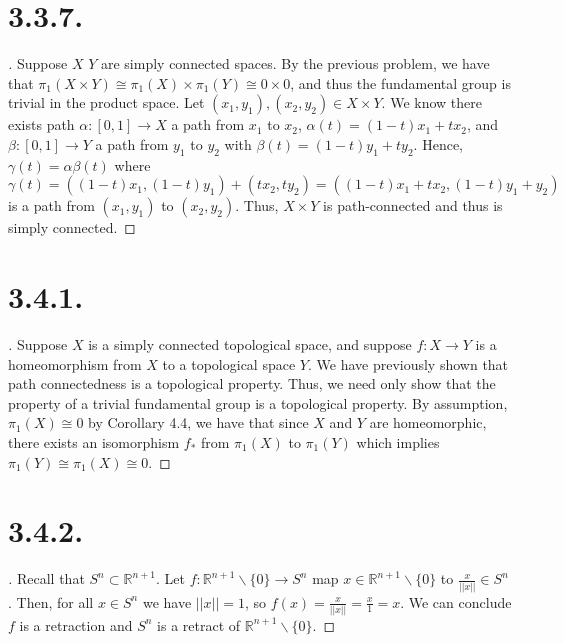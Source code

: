 \documentclass{article}
\begin{document}
\section*{3.3.7.}
\begin{proof}[\unskip\nopunct]
   Suppose $X$ $Y$ are simply connected spaces. By the previous problem, we have that $\pi_1(X \times Y) \cong \pi_1(X) \times \pi_1(Y) \cong 0 \times 0$, and thus
   the fundamental group is trivial in the product space. 
   Let $(x_1, y_1), (x_2, y_2) \in X \times Y$. We know there exists path $\alpha:[0, 1] \to X$ a path 
   from $x_1$ to $x_2$, $\alpha(t) = (1 - t)x_1 + tx_2$, and 
   $\beta:[0, 1] \to Y$ a path from $y_1$ to $y_2$ with $\beta(t) = (1 - t)y_1 + ty_2$. 
    Hence, $\gamma(t) = \alpha \beta(t)$ where $\gamma(t) = ((1 - t)x_1, (1 - t)y_1) + (tx_2, ty_2) = ((1 - t)x_1 + tx_2, (1 - t)y_1 + y_2)$ is a path from $(x_1, y_1)$ to $(x_2, y_2)$. 
    Thus, $X \times Y$ is path-connected and thus is simply connected. 
\end{proof}

\section*{3.4.1.}
\begin{proof}[\unskip\nopunct]
   Suppose $X$ is a simply connected topological space, and suppose $f:X \to Y$ is a homeomorphism from $X$ to a topological space $Y$. We have previously shown that path connectedness is a topological property. Thus, we need only show that 
   the property of a trivial fundamental group is a topological property. 
   By assumption, $\pi_1(X) \cong 0$ by Corollary 4.4, we have that since $X$ and $Y$ are homeomorphic, there exists an isomorphism $f_*$ from $\pi_1(X)$ to $\pi_1(Y)$
   which implies $\pi_1(Y) \cong \pi_1(X) \cong 0$. 

\end{proof}

\section*{3.4.2.}
\begin{proof}[\unskip\nopunct]
   Recall that $S^n \subset \mathbb{R}^{n + 1}$. Let $f:\mathbb{R}^{n + 1} \backslash \{0\} \to S^n$ map $x \in \mathbb{R}^{n + 1}\backslash \{0\}$ to $\frac{x}{||x||} \in S^n$. 
   Then, for all $x \in S^n$ we have $||x|| = 1$, so $f(x) = \frac{x}{||x||} = \frac{x}{1} = x$. We can conclude $f$ is a retraction and $S^n$ is a retract of $\mathbb{R}^{n + 1} \backslash \{0\}$. 
\end{proof}
\end{document}
